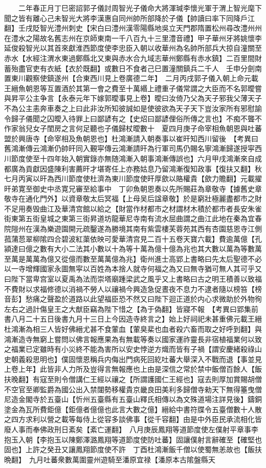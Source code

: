 　　二年春正月丁巳密詔郭子儀討周智光子儀命大將渾瑊李懷光軍于渭上智光麾下聞之皆有離心己未智光大將李漢惠自同州帥所部降於子儀【帥讀曰率下同降戶江翻】壬戌貶智光澧州刺史【宋白曰澧州漢零陽縣地吳立天門郡隋置松州尋改澧州州在澧水之陽故名舊志州在京師東南一千八百九十三里澧音禮】甲子華州牙將姚懷李延俊殺智光以其首來獻淮西節度使李忠臣入朝以收華州為名帥所部兵大掠自潼關至赤水【水經注渭水東過鄭縣北又東與赤水合九域志華州鄭縣有赤水鎮】二百里間財蓄殆盡官吏有衣紙【衣於既翻】或數日不食者己巳置潼關鎮兵二千人　壬申分劍南置東川觀察使鎮遂州【合東西川見上卷廣德二年】　二月丙戌郭子儀入朝上命元載王縉魚朝恩等互置酒於其第一會之費至十萬緡上禮重子儀常謂之大臣而不名郭曖嘗與昇平公主争言【永泰元年下嫁郭曖事見上卷】曖曰汝倚乃父為天子邪我父薄天子不為公主恚奔車奏之上曰此非汝所知彼誠如是使彼欲為天子天下豈汝家所有邪慰諭令歸子儀聞之囚曖入待罪上曰鄙諺有之【史炤曰鄙諺俚俗所傳之言也】不痴不聾不作家翁兒女子閨房之言何足聽也子儀歸杖曖數十　夏四月庚子命宰相魚朝恩與吐蕃盟於興唐寺【命宰相及魚朝恩也】杜鴻漸請入朝奏事以崔旰知西川留後　【考異曰舊鴻漸傳云鴻漸仍帥旰同入覲寜傳云鴻漸請旰為行軍司馬仍賜名寧鴻漸歸遂授寜西川節度使至十四年始入朝實錄亦無随鴻漸入朝事鴻漸傳誤也】六月甲戌鴻漸來自成都廣為貢獻因盛陳利害薦旰才堪寄任上亦務姑息乃留鴻漸復知政事【復扶又翻】秋七月丙寅以旰為西川節度使杜濟為東川節度使旰厚歛以賂權貴【歛力贍翻】元載擢旰弟寛至御史中丞寛兄審至給事中　丁卯魚朝恩奏以先所賜莊為章敬寺【據舊史章敬寺在通化門外】以資章敬太后冥福【上母吴后諡章敬】於是窮壯極麗盡都市之財不足用奏毁曲江及華清宫館以給之【財當作材都市之材謂材木積於都市者長安朱雀街東第五街皇城之東第三街昇道坊龍華尼寺南有流水屈曲謂之曲江此地在秦為宜春院隑州在漢為樂遊園開元疏鑿遂為勝境其南有紫雲樓芙蓉苑其西有杏園慈恩寺江側菰蒲䓤翠柳隂四合碧波紅蕖依映可愛華清宫見二百十五卷天寶六載】費逾萬億【孔潁達曰億之數有大小二法其小數以十為等十萬為億十億為兆也其大數以萬為等數萬至萬是萬萬為億又從億而數至萬萬億為兆】衛州進士高郢上書略曰先太后聖德不必以一寺增輝國家永圖無寜以百姓為本捨人就寺何福之為又曰無寺猶可無人其可乎又曰陛下當卑宫室以夏禹為法而崇塔廟踵梁武之風乎又上書略曰古之明王積善以致福不費財以求福修德以消禍不勞人以禳禍今興造急促晝夜不息力不逮者隨以榜笞【榜音彭】愁痛之聲盈於道路以此望福臣恐不然又曰陛下迴正道於内心求微助於外物徇左右之過計傷皇王之大猷臣竊為陛下惜之【為于偽翻】皆寢不報　【考異曰郢集前書八月二十五日後書九月十三日上今因造寺終言之】始上好祠祀未甚重佛元載王縉杜鴻漸為相三人皆好佛縉尤甚不食葷血【葷臭棐也血者殺六畜而取之好呼到翻】與鴻漸造寺無窮上嘗問以佛言報應果為有無載等奏以國家運祚靈長非宿植福業何以致之福業已定雖時有小災終不能為害所以安史悖逆方熾而皆有子禍【謂安慶緒殺祿山史朝義殺思明也】僕固懷恩稱兵内侮出門病死回紇吐蕃大舉深入不戰而退【事並見上卷上年】此皆非人力所及豈得言無報應也上由是深信之常於禁中飯僧百餘人【飯扶晚翻】有寇至則令僧講仁王經以禳之【所謂護國仁王經也】寇去則厚加賞賜胡僧不空官至卿監爵為國公出入禁闥勢移權貴京畿良田美利多歸僧寺勑天下無得箠曳僧尼造金閣寺於五臺山【忻州五臺縣有五臺山釋氏相傳以為文殊道場注詳見後】鑄銅塗金為瓦所費鉅億【鉅億者億億也此言大數之億】縉給中書符牒令五臺僧數十人散之四方求利以營之載等每侍上從容多談佛事【從千容翻】由是中外臣民承流相化皆廢人事而奉佛政刑日紊矣【紊亡運翻】　八月庚辰鳳翔等道節度使左僕射平章事李抱玉入朝【李抱玉以陳鄭澤潞鳳翔等道節度使防吐蕃】固讓僕射言辭確至【確堅也固也】上許之癸丑又讓鳳翔節度使不許　丁酉杜鴻漸飯千僧以使蜀無恙故也【飯扶晩翻】　九月吐蕃衆數萬圍靈州遊騎至潘原宜禄【潘原本古隂盤縣天